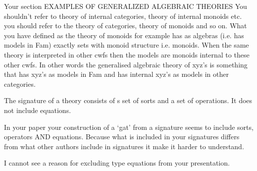 \note 
Your section EXAMPLES OF GENERALIZED ALGEBRAIC THEORIES
You  shouldn't refer to theory of internal categories, theory of internal monoids etc. you should refer to the
theory of categories, theory of monoids and so on. What you have defined as the theory of monoids for example has
as algebras (i.e. has models in Fam) exactly sets with monoid structure i.e. monoids. When the same theory is interpreted in other cwfs then
the models are monoids internal to these other cwfs. In other words the generalised algebraic theory of xyz's is something that has xyz's as models in Fam and has internal xyz's as models in other categories. 

\note
The signature of a theory consists of s set of sorts and a set of operations. It does not include equations. 

\note
In your paper your construction of a `gat' from a signature seems to include sorts, operators AND equations. Because 
what is included in your signatures differs from what other authors include in signatures it make it harder to understand.

\note
I cannot see a reason for excluding type equations from your presentation.
